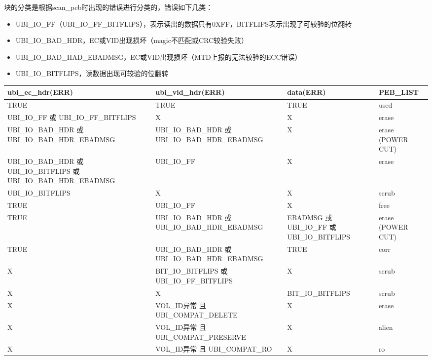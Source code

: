 块的分类是根据scan\_peb时出现的错误进行分类的，错误如下几类：
\begin{itemize}
  \item UBI\_IO\_FF（UBI\_IO\_FF\_BITFLIPS），表示读出的数据只有0XFF，BITFLIPS表示出现了可较验的位翻转
  \item UBI\_IO\_BAD\_HDR，EC或VID出现损坏（magic不匹配或CRC较验失败）
  \item UBI\_IO\_BAD\_HAD\_EBADMSG，EC或VID出现损坏（MTD上报的无法较验的ECC错误）
  \item UBI\_IO\_BITFLIPS，读数据出现可较验的位翻转
\end{itemize}
\clearpage
\begin{tabu} to 
\hline
ubi\_ec\_hdr(ERR) & ubi\_vid\_hdr(ERR) & data(ERR) & PEB\_LIST\\ \hline
TRUE & TRUE & TRUE & used\\ \hline
UBI\_IO\_FF 或
UBI\_IO\_FF\_BITFLIPS & X & X & erase\\ \hline
UBI\_IO\_BAD\_HDR 或
UBI\_IO\_BAD\_HDR\_EBADMSG & UBI\_IO\_BAD\_HDR 或
UBI\_IO\_BAD\_HDR\_EBADMSG & X & erase
(POWER CUT)\\ \hline
UBI\_IO\_BAD\_HDR 或
UBI\_IO\_BITFLIPS 或
UBI\_IO\_BAD\_HDR\_EBADMSG & UBI\_IO\_FF & X & erase\\ \hline
UBI\_IO\_BITFLIPS & X & X & scrub\\ \hline
TRUE & UBI\_IO\_FF & X & free\\ \hline
TRUE & UBI\_IO\_BAD\_HDR 或
UBI\_IO\_BAD\_HDR\_EBADMSG & EBADMSG 或
UBI\_IO\_FF 或
UBI\_IO\_BITFLIPS & erase
(POWER CUT)\\ \hline
TRUE & UBI\_IO\_BAD\_HDR 或
UBI\_IO\_BAD\_HDR\_EBADMSG & TRUE & corr\\ \hline
X & BIT\_IO\_BITFLIPS 或
UBI\_IO\_FF\_BITFLIPS & X & scrub\\ \hline
X & X & BIT\_IO\_BITFLIPS & scrub\\ \hline
X & VOL\_ID异常 且 
UBI\_COMPAT\_DELETE & X & erase\\ \hline
X & VOL\_ID异常 且 
UBI\_COMPAT\_PRESERVE & X & alien\\ \hline
X & VOL\_ID异常 且 
UBI\_COMPAT\_RO & X & ro\\ \hline
\end{tabu}

